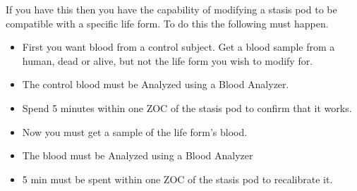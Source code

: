 \documentclass[green]{guildcamp4}
\begin{document}
\name{\gModStasis{}}

If you have this then you have the capability of modifying a stasis pod to be compatible with a specific life form. To do this the following must happen.

\begin{itemize}
	\item First you want blood from a control subject. Get a blood sample from a human, dead or alive, but not the life form you wish to modify for.
	\item The control blood must be Analyzed using a Blood Analyzer.
	\item Spend 5 minutes within one ZOC of the stasis pod to confirm that it works.
	\item Now you must get a sample of the life form's blood.
	\item The blood must be Analyzed using a Blood Analyzer
	\item 5 min must be spent within one ZOC of the stasis pod to recalibrate it.
\end{itemize}
\end{document}
